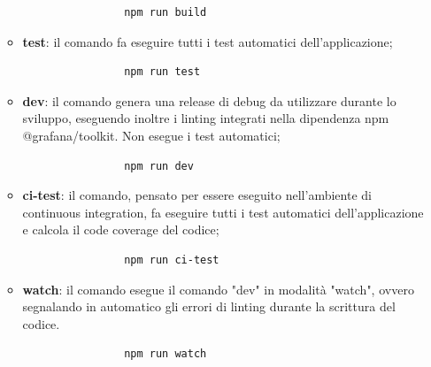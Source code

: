 \begin{itemize}
\begin{itemize}
			\begin{verbatim}
				npm run build
			\end{verbatim}
			\item \textbf{test}: il comando fa eseguire tutti i test automatici dell'applicazione;
			\begin{verbatim}
				npm run test
			\end{verbatim}
			\item \textbf{dev}: il comando genera una release di debug da utilizzare durante lo sviluppo, eseguendo inoltre i linting integrati nella dipendenza npm @grafana/toolkit. Non esegue i test automatici;
			\begin{verbatim}
				npm run dev
			\end{verbatim}
			\item \textbf{ci-test}: il comando, pensato per essere eseguito nell'ambiente di continuous integration, fa eseguire tutti i test automatici dell'applicazione e calcola il code coverage del codice;
			\begin{verbatim}
				npm run ci-test
			\end{verbatim}
			\item \textbf{watch}: il comando esegue il comando "dev" in modalità "watch", ovvero segnalando in automatico gli errori di linting durante la scrittura del codice.
			\begin{verbatim}
				npm run watch
			\end{verbatim}
		\end{itemize}
\end{itemize}
